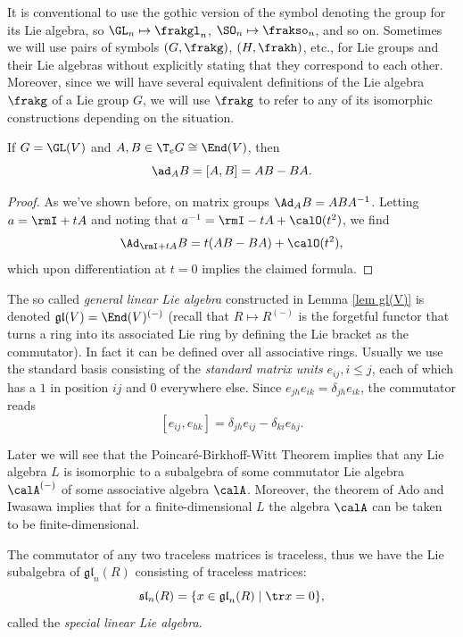 \begin{rem}
    It is conventional to use the gothic version of the symbol denoting the group for its Lie algebra, so $\GL_n\mapsto \frakgl_n$, $\SO_n\mapsto \frakso_n$, and so on. Sometimes we will use pairs of symbols $(G,\frakg)$, $(H,\frakh)$, etc., for Lie groups and their Lie algebras without explicitly stating that they correspond to each other. Moreover, since we will have several equivalent definitions of the Lie algebra $\frakg$ of a Lie group $G$, we will use $\frakg$ to refer to any of its isomorphic constructions depending on the situation.
\end{rem}

\begin{lem}\label{lem gl(V)}
    If $G=\GL(V)$ and $A,B\in \T_e G\cong \End(V)$, then 
    \[\ad_A B=[A,B]=AB-BA.\]
\end{lem}
\begin{proof}
    As we've shown before, on matrix groups $\Ad_A B=ABA^{-1}$. Letting $a=\rmI+tA$ and noting that $a^{-1}=\rmI-tA+\calO(t^2)$, we find
    \[\Ad_{\rmI+tA} B=t(AB-BA)+\calO(t^2),\]
    which upon differentiation at $t=0$ implies the claimed formula.
\end{proof}


\begin{example}[$\mathfrak{gl}_n(R)$]
    The so called \emph{general linear Lie algebra} constructed in Lemma \ref{lem gl(V)} is denoted $\mathfrak{gl}(V)=\End(V)^{(-)}$ (recall that $R\mapsto R^{(-)}$ is the forgetful functor that turns a ring into its associated Lie ring by defining the Lie bracket as the commutator). In fact it can be defined over all associative rings. Usually we use the standard basis consisting of the \emph{standard matrix units} $e_{ij},i\leq j$, each of which has a $1$ in position $ij$ and $0$ everywhere else. Since $e_{jh}e_{ik}=\delta_{jh}e_{ik}$, the commutator reads
    \[[e_{ij},e_{hk}]=\delta_{jh}e_{ij}-\delta_{ki}e_{hj}.\]

    Later we will see that the Poincar\'e-Birkhoff-Witt Theorem implies that any Lie algebra $L$ is isomorphic to a subalgebra of some commutator Lie algebra $\calA^{(-)}$ of some associative algebra $\calA$. Moreover, the theorem of Ado and Iwasawa implies that for a finite-dimensional $L$ the algebra $\calA$ can be taken to be finite-dimensional.
\end{example}

\begin{example}[$\mathfrak{sl}_n(R)$]
    The commutator of any two traceless matrices is traceless, thus we have the Lie subalgebra of $\mathfrak{gl}_n(R)$ consisting of traceless matrices:
    \[\mathfrak{sl}_n(R)=\{x\in \mathfrak{gl}_n(R)\mid \tr x=0\},\]
    called the \emph{special linear Lie algebra}.
\end{example}

